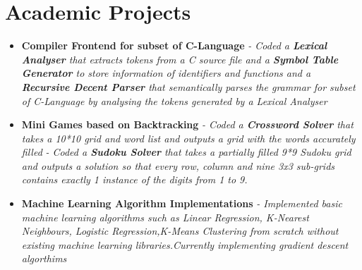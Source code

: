 \documentclass{article}
\begin{document}
\section*{Academic Projects}
\begin{itemize}
    \item{\textbf{\large{Compiler Frontend for subset of C-Language}}}
          \newline
          \textit{- Coded a \textbf{Lexical Analyser} that extracts tokens from a C source file and a \textbf{Symbol Table Generator} to store information of identifiers and functions and a \textbf{Recursive Decent Parser} that semantically parses the grammar for subset of C-Language by analysing the tokens generated by a Lexical Analyser}

    \item{\textbf{\large{Mini Games based on Backtracking}}}
          \newline
          \textit{- Coded a \textbf{Crossword Solver} that takes a 10*10 grid and word list and outputs a grid with the words accurately filled}
          \newline
          \textit{- Coded a \textbf{Sudoku Solver} that takes a partially filled 9*9 Sudoku grid and outputs a solution so that every row, column and nine 3x3 sub-grids contains exactly 1 instance of the digits from 1 to 9.}

    \item{\textbf{\large{Machine Learning Algorithm Implementations}}}
          \newline
          \textit{- Implemented basic machine learning algorithms such as Linear Regression, K-Nearest Neighbours, Logistic Regression,K-Means Clustering from scratch without existing machine learning libraries.Currently implementing gradient descent algorthims}



\end{itemize}
\end{document}
